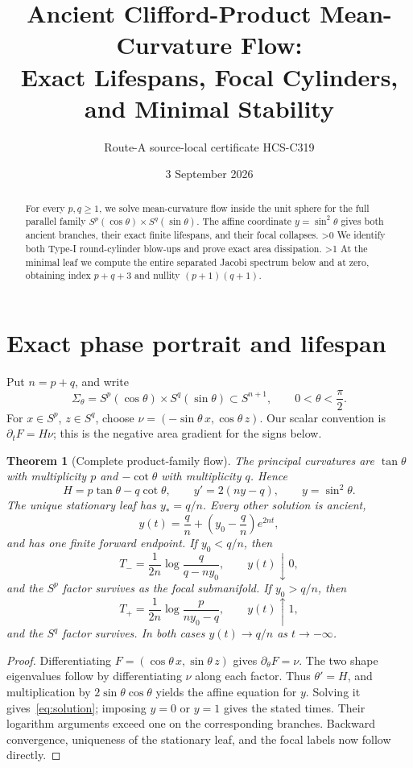 \documentclass[10pt]{article}
\title{Ancient Clifford-Product Mean-Curvature Flow:\\Exact Lifespans, Focal Cylinders, and Minimal Stability}
\author{Route-A source-local certificate HCS-C319}
\date{3 September 2026}
\providecommand{\CRevisionRound}{2}
\newtheorem{theorem}{Theorem}
\begin{document}
\maketitle
\begin{abstract}
For every $p,q\geq1$, we solve mean-curvature flow inside the unit sphere
for the full parallel family $S^p(\cos\theta)\times S^q(\sin\theta)$.
The affine coordinate $y=\sin^2\theta$ gives both ancient branches, their
exact finite lifespans, and their focal collapses.
\ifnum\CRevisionRound>0
We identify both Type-I round-cylinder blow-ups and prove exact area
dissipation.
\fi
\ifnum\CRevisionRound>1
At the minimal leaf we compute the entire separated Jacobi spectrum below
and at zero, obtaining index $p+q+3$ and nullity $(p+1)(q+1)$.
\fi
\end{abstract}

\section{Exact phase portrait and lifespan}
Put $n=p+q$, and write
\[
 \Sigma_\theta=S^p(\cos\theta)\times S^q(\sin\theta)
 \subset S^{n+1},\qquad 0<\theta<\frac\pi2.
\]
For $x\in S^p$, $z\in S^q$, choose
$\nu=(-\sin\theta\,x,\cos\theta\,z)$.  Our scalar convention is
$\partial_tF=H\nu$; this is the negative area gradient for the signs below.

\begin{theorem}[Complete product-family flow]\label{thm:phase}
The principal curvatures are $\tan\theta$ with multiplicity $p$ and
$-\cot\theta$ with multiplicity $q$.  Hence
\[
 H=p\tan\theta-q\cot\theta,
 \qquad y'=2(ny-q),\qquad y=\sin^2\theta.
\]
The unique stationary leaf has $y_*=q/n$.  Every other solution is ancient,
\begin{equation}\label{eq:solution}
 y(t)=\frac qn+\left(y_0-\frac qn\right)e^{2nt},
\end{equation}
and has one finite forward endpoint.  If $y_0<q/n$, then
\[
 T_-=\frac1{2n}\log \frac q{q-ny_0},\qquad y(t)\downarrow0,
\]
and the $S^p$ factor survives as the focal submanifold.  If $y_0>q/n$, then
\[
 T_+=\frac1{2n}\log \frac p{ny_0-q},\qquad y(t)\uparrow1,
\]
and the $S^q$ factor survives.  In both cases $y(t)\to q/n$ as
$t\to-\infty$.
\end{theorem}
\begin{proof}
Differentiating $F=(\cos\theta\,x,\sin\theta\,z)$ gives
$\partial_\theta F=\nu$.  The two shape eigenvalues follow by differentiating
$\nu$ along each factor.  Thus $\theta'=H$, and multiplication by
$2\sin\theta\cos\theta$ yields the affine equation for $y$.  Solving it
gives~\eqref{eq:solution}; imposing $y=0$ or $y=1$ gives the stated times.
Their logarithm arguments exceed one on the corresponding branches.
Backward convergence, uniqueness of the stationary leaf, and the focal
labels now follow directly.
\end{proof}
\end{document}

